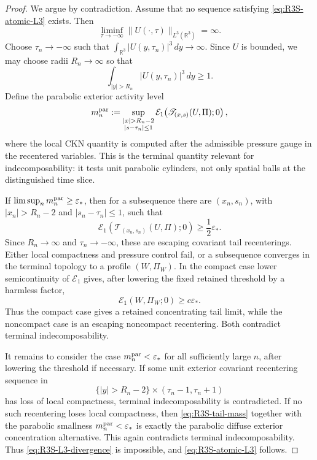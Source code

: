 \documentclass[11pt]{amsart}
\numberwithin{equation}{section}
\theoremstyle{plain}
\theoremstyle{definition}
\theoremstyle{remark}
\newcommand{\calE}{\mathcal E}
\begin{document}
\begin{proof}
We argue by contradiction.  Assume that no sequence satisfying
\eqref{eq:R3S-atomic-L3} exists.  Then
\begin{equation}\label{eq:R3S-L3-divergence}
   \liminf_{\tau\to-\infty}\|U(\cdot,\tau)\|_{L^3(\mathbb R^3)}=\infty .
\end{equation}
Choose \(\tau_n\to-\infty\) such that
\(
   \int_{\mathbb R^3}|U(y,\tau_n)|^3\,dy\to\infty .
\)
Since \(U\) is bounded, we may choose radii \(R_n\to\infty\) so that
\begin{equation}\label{eq:R3S-tail-mass}
   \int_{|y|>R_n}|U(y,\tau_n)|^3\,dy\ge 1 .
\end{equation}
Define the parabolic exterior activity level
\[
   m_n^{\rm par}
   :=
   \sup_{\substack{|x|>R_n-2\\ |s-\tau_n|\le1}}
   \calE_1\!\left(\mathscr T_{(x,s)}(U,\Pi);0\right),
\]
where the local CKN quantity is computed after the admissible pressure gauge in
the recentered variables.  This is the terminal quantity relevant for
indecomposability: it tests unit parabolic cylinders, not only spatial balls at
the distinguished time slice.

If \(\limsup_n m_n^{\rm par}\ge\varepsilon_*\), then for a subsequence there
are \((x_n,s_n)\), with \(|x_n|>R_n-2\) and \(|s_n-\tau_n|\le1\), such that
\[
   \calE_1\!\left(\mathscr T_{(x_n,s_n)}(U,\Pi);0\right)
   \ge\frac12\varepsilon_* .
\]
Since \(R_n\to\infty\) and \(\tau_n\to-\infty\), these are escaping covariant
tail recenterings.  Either local compactness and pressure control fail, or a
subsequence converges in the terminal topology to a profile \((W,\Pi_W)\).
In the compact case lower semicontinuity of \(\calE_1\) gives, after lowering
the fixed retained threshold by a harmless factor,
\[
   \calE_1(W,\Pi_W;0)\ge c\varepsilon_* .
\]
Thus the compact case gives a retained concentrating tail limit, while the
noncompact case is an escaping noncompact recentering.  Both contradict
terminal indecomposability.

It remains to consider the case \(m_n^{\rm par}<\varepsilon_*\) for all
sufficiently large \(n\), after lowering the threshold if necessary.  If some
unit exterior covariant recentering sequence in
\[
   \{|y|>R_n-2\}\times(\tau_n-1,\tau_n+1)
\]
has loss of local compactness, terminal indecomposability is contradicted.  If
no such recentering loses local compactness, then
\eqref{eq:R3S-tail-mass} together with the parabolic smallness
\(m_n^{\rm par}<\varepsilon_*\) is exactly the parabolic diffuse exterior
concentration alternative.  This again contradicts terminal indecomposability.
Thus \eqref{eq:R3S-L3-divergence} is impossible, and
\eqref{eq:R3S-atomic-L3} follows.
\end{proof}
\end{document}
